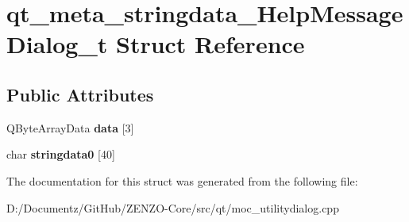 \hypertarget{structqt__meta__stringdata___help_message_dialog__t}{}\section{qt\+\_\+meta\+\_\+stringdata\+\_\+\+Help\+Message\+Dialog\+\_\+t Struct Reference}
\label{structqt__meta__stringdata___help_message_dialog__t}
\subsection*{Public Attributes}
\begin{DoxyCompactItemize}
\item 
\mbox{\label{structqt__meta__stringdata___help_message_dialog__t_aac8237a26a6ab1131d8aaaab7580a9bb}} 
Q\+Byte\+Array\+Data {\bfseries data} \mbox{[}3\mbox{]}
\item 
\mbox{\label{structqt__meta__stringdata___help_message_dialog__t_af3c00d678f2baf0a2fcff77eaf5c216e}} 
char {\bfseries stringdata0} \mbox{[}40\mbox{]}
\end{DoxyCompactItemize}


The documentation for this struct was generated from the following file\+:\begin{DoxyCompactItemize}
\item 
D\+:/\+Documentz/\+Git\+Hub/\+Z\+E\+N\+Z\+O-\/\+Core/src/qt/moc\+\_\+utilitydialog.\+cpp\end{DoxyCompactItemize}
